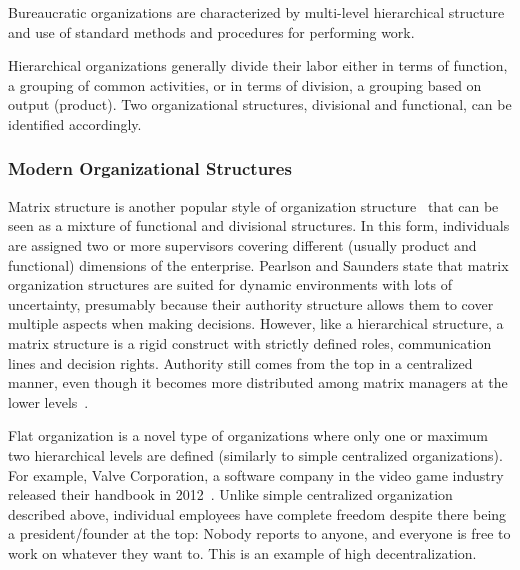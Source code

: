 Bureaucratic organizations \cite{mintzberg1981} are characterized by multi-level hierarchical structure and use of standard methods and procedures for performing work. 

Hierarchical organizations generally divide their labor either in terms of function, a grouping of common activities, or in terms of division, a grouping based on output (product). Two organizational structures, divisional and functional, can be identified accordingly.

\subsubsection{Modern Organizational Structures}

Matrix structure is another popular style of organization structure~\cite{pearlson2009} that can be seen as a mixture of functional and divisional structures. In this form, individuals are assigned two or more supervisors covering different (usually product and functional) dimensions of the enterprise. Pearlson and Saunders state that matrix organization structures are suited for dynamic environments with lots of uncertainty, presumably because their authority structure allows them to cover multiple aspects when making decisions. However, like a hierarchical structure, a matrix structure is a rigid construct with strictly defined roles, communication lines and decision rights. Authority still comes from the top in a centralized manner, even though it becomes more distributed among matrix managers at the lower levels~\cite{pearlson2009}. 


Flat organization is a novel type of organizations where only one or maximum two hierarchical levels are defined (similarly to simple centralized organizations). For example, Valve Corporation, a software company in the video game industry released their handbook in 2012~\cite{valveHandbook}.  Unlike simple centralized organization described above, individual employees have complete freedom despite there being a president/founder at the top: Nobody reports to anyone, and everyone is free to work on whatever they want to. This is an example of high decentralization.

